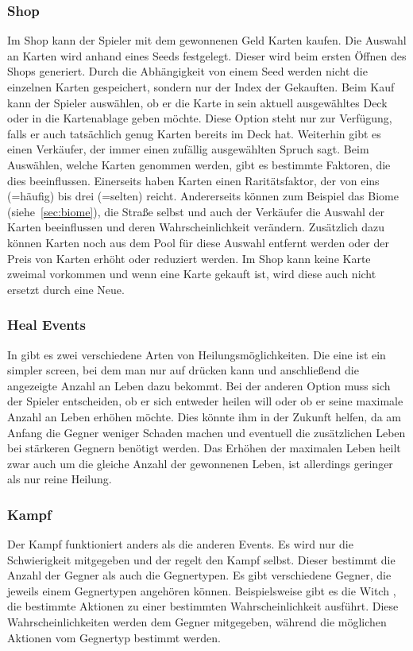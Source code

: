\subsubsection{Shop}\label{subsubsec:shop}
Im Shop kann der Spieler mit dem gewonnenen Geld Karten kaufen.
Die Auswahl an Karten wird anhand eines Seeds festgelegt.
Dieser wird beim ersten Öffnen des Shops generiert.
Durch die Abhängigkeit von einem Seed werden nicht die einzelnen Karten gespeichert, sondern nur der Index der Gekauften.
Beim Kauf kann der Spieler auswählen, ob er die Karte in sein aktuell ausgewähltes Deck oder in die Kartenablage geben möchte.
Diese Option steht nur zur Verfügung, falls er auch tatsächlich genug Karten bereits im Deck hat.
Weiterhin gibt es einen Verkäufer, der immer einen zufällig ausgewählten Spruch sagt.
Beim Auswählen, welche Karten genommen werden, gibt es bestimmte Faktoren, die dies beeinflussen.
Einerseits haben Karten einen Raritätsfaktor, der von eins (=häufig) bis drei (=selten) reicht.
Andererseits können zum Beispiel das Biome (siehe~\ref{sec:biome}), die Straße selbst und auch der Verkäufer die Auswahl der Karten beeinflussen und deren Wahrscheinlichkeit verändern.
Zusätzlich dazu können Karten noch aus dem Pool für diese Auswahl entfernt werden oder der Preis von Karten erhöht oder reduziert werden.
Im Shop kann keine Karte zweimal vorkommen und wenn eine Karte gekauft ist, wird diese auch nicht ersetzt durch eine Neue.

\subsubsection{Heal Events}\label{subsubsec:heal-event}
In \FF gibt es zwei verschiedene Arten von Heilungsmöglichkeiten.
Die eine ist ein simpler screen, bei dem man nur auf  drücken kann und anschließend die angezeigte Anzahl an Leben dazu bekommt.
Bei der anderen Option muss sich der Spieler entscheiden, ob er sich entweder heilen will oder ob er seine maximale Anzahl an Leben erhöhen möchte.
Dies könnte ihm in der Zukunft helfen, da am Anfang die Gegner weniger Schaden machen und eventuell die zusätzlichen Leben bei stärkeren Gegnern benötigt werden.
Das Erhöhen der maximalen Leben heilt zwar auch um die gleiche Anzahl der gewonnenen Leben, ist allerdings geringer als nur reine Heilung.

\subsubsection{Kampf}\label{subsubsec:kampf}
Der Kampf funktioniert anders als die anderen Events.
Es wird nur die Schwierigkeit mitgegeben und der  regelt den Kampf selbst.
Dieser bestimmt die Anzahl der Gegner als auch die Gegnertypen.
Es gibt verschiedene Gegner, die jeweils einem Gegnertypen angehören können.
Beispielsweise gibt es die Witch , die bestimmte Aktionen zu einer bestimmten Wahrscheinlichkeit ausführt.
Diese Wahrscheinlichkeiten werden dem Gegner mitgegeben, während die möglichen Aktionen vom Gegnertyp bestimmt werden.

